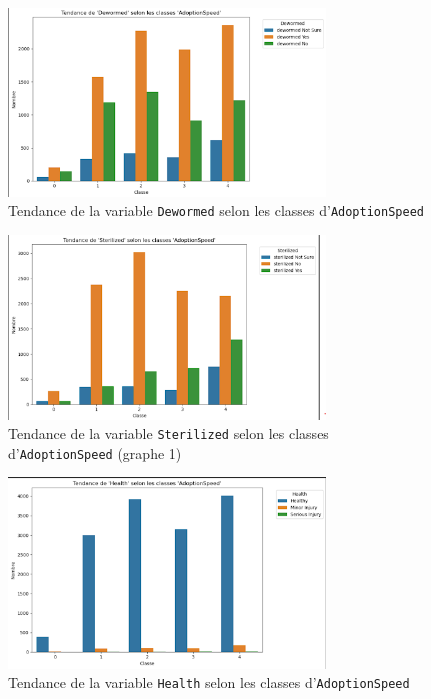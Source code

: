 \documentclass[a4paper,12pt]{article}
\begin{document}
\begin{figure}[H]
    \centering
    \includegraphics[width=0.75\textwidth]{dewormed_adoption_trend.png}
    \caption{Tendance de la variable \texttt{Dewormed} selon les classes d'\texttt{AdoptionSpeed}}
    \label{fig:dewormed_trend}
\end{figure}

\begin{figure}[H]
    \centering
    \includegraphics[width=0.75\textwidth]{sterilized_adoption_trend.png}
    \caption{Tendance de la variable \texttt{Sterilized} selon les classes d'\texttt{AdoptionSpeed} (graphe 1)}
    \label{fig:sterilized_trend_1}
\end{figure}

\begin{figure}[H]
    \centering
    \includegraphics[width=0.75\textwidth]{health_adoption_trend.png}
    \caption{Tendance de la variable \texttt{Health} selon les classes d'\texttt{AdoptionSpeed}}
    \label{fig:health_trend}
\end{figure}
\end{document}

